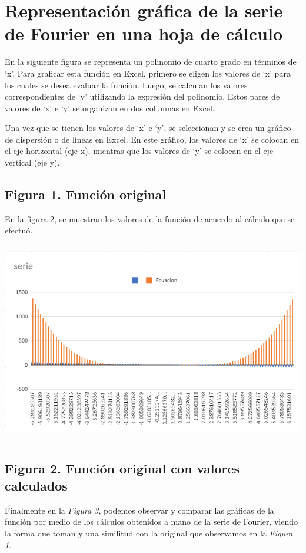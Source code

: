 
\section{Representación gráfica de la serie de Fourier en una hoja de cálculo}

En la siguiente figura se representa un polinomio de cuarto grado en términos de `x'. Para graficar esta función en Excel, primero se eligen los valores de `x' para los cuales se desea evaluar la función. Luego, se calculan los valores correspondientes de `y' utilizando la expresión del polinomio. Estos pares de valores de `x' e `y' se organizan en dos columnas en Excel.

Una vez que se tienen los valores de `x' e `y', se seleccionan y se crea un gráfico de dispersión o de líneas en Excel. En este gráfico, los valores de `x' se colocan en el eje horizontal (eje x), mientras que los valores de `y' se colocan en el eje vertical (eje y).

\subsection{Figura 1. Función original}

En la figura 2, se muestran los valores de la función de acuerdo al cálculo que se efectuó.

\includegraphics[width=6.26772in,height=3.44444in]{media/image10.png}

\subsection{Figura 2. Función original con valores calculados}

Finalmente en la \emph{Figura 3}, podemos observar y comparar las gráficas de la función por medio de los cálculos obtenidos a mano de la serie de Fourier, viendo la forma que toman y una similitud con la original que observamos en la \emph{Figura 1}.

